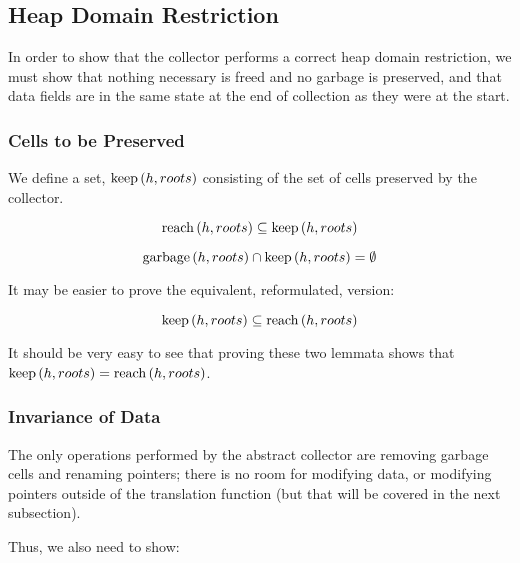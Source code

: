 \subsection{Heap Domain Restriction}

In order to show that the \gls{collector} performs a correct
\gls{heap} domain restriction, we must show that nothing necessary is
freed and no garbage is preserved, and that data fields are
in the same state at the end of collection as they were at the start.

\subsubsection{Cells to be Preserved}

We define a set, $\mathrm{keep}\left(h, roots\right)$ consisting of the set of
\glspl{cell} preserved by the collector.

\begin{lemma}
  \[\mathrm{reach}\left(h, roots\right) \subseteq \mathrm{keep}\left(h, roots\right)\]
\end{lemma}

\begin{lemma}
  \[\mathrm{garbage}\left(h, roots\right) \cap \mathrm{keep}\left(h, roots\right) = \emptyset\]

  It may be easier to prove the equivalent, reformulated, version:

  \[\mathrm{keep}\left(h, roots\right) \subseteq \mathrm{reach}\left(h, roots\right)\]
\end{lemma}

It should be very easy to see that proving these two lemmata shows
that $\mathrm{keep}\left(h, roots\right) = \mathrm{reach}\left(h, roots\right)$.

\subsubsection{Invariance of Data}

The only operations performed by the abstract collector are removing
garbage cells and renaming \glspl{pointer}; there is no room for
modifying data, or modifying \glspl{pointer} outside of the
translation function (but that will be covered in the next
subsection).

Thus, we also need to show:

\begin{lemma}
\end{lemma}

\begin{lemma}
\end{lemma}

